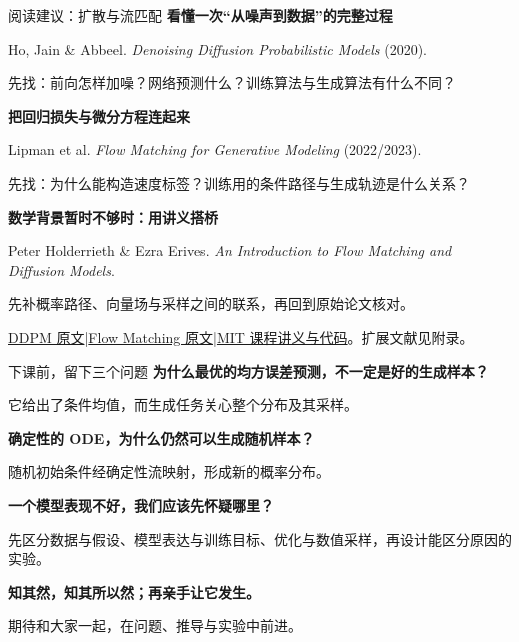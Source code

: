 \documentclass[UTF8,aspectratio=169,11pt,fontset=none]{ctexbeamer}
\newcommand{\head}[1]{{\color{accent}\bfseries #1}\par\vspace{0.07cm}}
\newcommand{\source}[1]{\vfill{\fontsize{6.3}{7.8}\selectfont\color{muted}#1\par}}
\begin{document}
\begin{frame}{阅读建议：扩散与流匹配}
\head{看懂一次“从噪声到数据”的完整过程}
\small Ho, Jain \& Abbeel. \textit{Denoising Diffusion Probabilistic Models} (2020).\par
\normalsize 先找：前向怎样加噪？网络预测什么？训练算法与生成算法有什么不同？

\vspace{0.17cm}
\head{把回归损失与微分方程连起来}
\small Lipman et al. \textit{Flow Matching for Generative Modeling} (2022/2023).\par
\normalsize 先找：为什么能构造速度标签？训练用的条件路径与生成轨迹是什么关系？

\vspace{0.17cm}
\head{数学背景暂时不够时：用讲义搭桥}
\small Peter Holderrieth \& Ezra Erives. \textit{An Introduction to Flow Matching and Diffusion Models}.\par
\normalsize 先补概率路径、向量场与采样之间的联系，再回到原始论文核对。
\source{\href{https://arxiv.org/abs/2006.11239}{DDPM 原文}\quad|\quad\href{https://arxiv.org/abs/2210.02747}{Flow Matching 原文}\quad|\quad\href{https://diffusion.csail.mit.edu/}{MIT 课程讲义与代码}。扩展文献见附录。}
\end{frame}

\begin{frame}{下课前，留下三个问题}
\vspace{0.16cm}
\head{为什么最优的均方误差预测，不一定是好的生成样本？}
它给出了条件均值，而生成任务关心整个分布及其采样。

\vspace{0.15cm}
\head{确定性的 ODE，为什么仍然可以生成随机样本？}
随机初始条件经确定性流映射，形成新的概率分布。

\vspace{0.15cm}
\head{一个模型表现不好，我们应该先怀疑哪里？}
先区分数据与假设、模型表达与训练目标、优化与数值采样，再设计能区分原因的实验。

\vspace{0.20cm}
\begin{tcolorbox}[colback=paper,colframe=paper,boxrule=0pt,arc=2mm,top=3mm,bottom=3mm]
\centering\large\bfseries 知其然，知其所以然；\quad 再亲手让它发生。\par
\vspace{0.10cm}\normalfont\small 期待和大家一起，在问题、推导与实验中前进。
\end{tcolorbox}
\end{frame}
\end{document}

